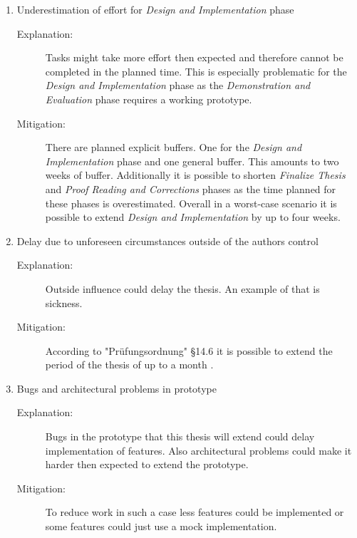 \begin{enumerate}[label=Risk \arabic*:, align=left, leftmargin=*]
    \item Underestimation of effort for \emph{Design and Implementation} phase
        \begin{description}
            \item[Explanation:] Tasks might take more effort then expected and therefore cannot be completed in the planned time. This is especially problematic for the \emph{Design and Implementation} phase as the \emph{Demonstration and Evaluation} phase requires  a working prototype.
            \item[Mitigation:] There are planned explicit buffers. One for the \emph{Design and Implementation} phase and one general buffer. This amounts to two weeks of buffer. Additionally it is possible to shorten \emph{Finalize Thesis} and \emph{Proof Reading and Corrections} phases as the time planned for these phases is overestimated. Overall in a worst-case scenario it is possible to extend \emph{Design and Implementation} by up to four weeks.
        \end{description}
    \pagebreak[3]    
    \item Delay due to unforeseen circumstances outside of the authors control
        \begin{description}
            \item[Explanation:] Outside influence could delay the thesis. An example of that is sickness.
            \item[Mitigation:] According to "Prüfungsordnung" §14.6 it is possible to extend the period of the thesis of up to a month \cite[~ p. 724]{StudienUndPrufungsordnung2015}.
        \end{description}
    \pagebreak[3]
    \item Bugs and architectural problems in prototype
        \begin{description}
            \item[Explanation:] Bugs in the prototype that this thesis will extend could delay implementation of features. Also architectural problems could make it harder then expected to extend the prototype.
            \item[Mitigation:] To reduce work in such a case less features could be implemented or some features could just use a mock implementation.
        \end{description}
\end{enumerate}